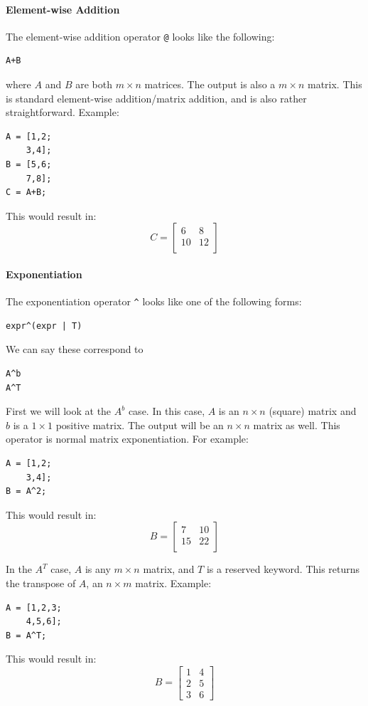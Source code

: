 \paragraph{Element-wise Addition}
The element-wise addition operator \verb=@= looks like the following:
\begin{lstlisting}
A+B
\end{lstlisting}
where $A$ and $B$ are both $m\times n$ matrices.  The output is also a $m \times n$ matrix. This is standard element-wise addition/matrix addition, and is also rather straightforward.  Example:
\begin{lstlisting}
A = [1,2;
    3,4];
B = [5,6;
    7,8];
C = A+B;
\end{lstlisting}
This would result in:
$$C=\begin{bmatrix}
6&8\\
10&12\\
\end{bmatrix}$$

\cprotect\paragraph{Exponentiation}
The exponentiation operator \verb=^= looks like one of the following forms:
\begin{lstlisting}
expr^(expr | T)
\end{lstlisting}
We can say these correspond to
\begin{lstlisting}
A^b
A^T
\end{lstlisting}
First we will look at the $A^b$ case.  In this case, $A$ is an $n\times n$ (square) matrix and $b$ is a $1\times 1$ positive matrix.  The output will be an $n\times n$ matrix as well.  This operator is normal matrix exponentiation.  For example:
\begin{lstlisting}
A = [1,2;
    3,4];
B = A^2;
\end{lstlisting}
This would result in:
$$B=\begin{bmatrix}
7&10\\
15&22\\
\end{bmatrix}$$

In the $A^T$ case, $A$ is any $m\times n$ matrix, and $T$ is a reserved keyword.  This returns the transpose of $A$, an $n \times m$ matrix.  Example:
\begin{lstlisting}
A = [1,2,3;
    4,5,6];
B = A^T;
\end{lstlisting}
This would result in:
$$B=\begin{bmatrix}
1&4\\
2&5\\
3&6
\end{bmatrix}$$

